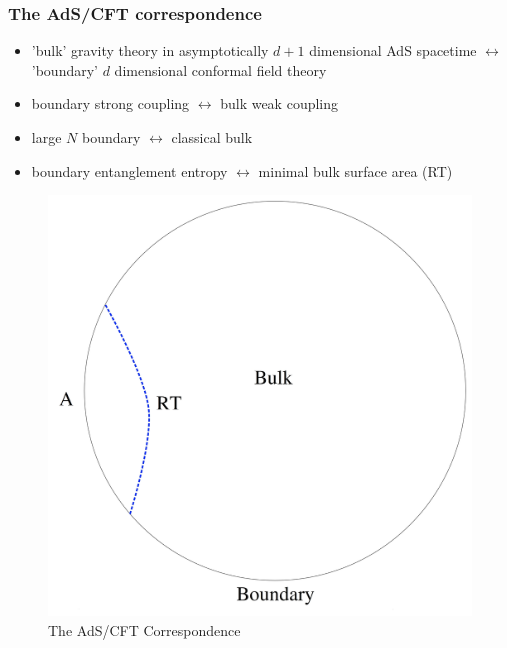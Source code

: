 \documentclass[10pt,aspectratio=169]{beamer}
\begin{document}
\begin{frame}
\frametitle{The AdS/CFT correspondence}

\begin{minipage}[t]{0.48\linewidth}

\begin{itemize}

\item 'bulk' gravity theory in asymptotically $d+1$ dimensional AdS spacetime $\leftrightarrow$ 'boundary' $d$ dimensional conformal field theory

\item boundary strong coupling $\leftrightarrow$ bulk weak coupling

\item large $N$ boundary $\leftrightarrow$ classical bulk

\item boundary entanglement entropy $\leftrightarrow$ minimal bulk surface area (RT)

\end{itemize}

\end{minipage}
%
\hfill
%
\begin{minipage}[t]{0.48\linewidth}

\begin{figure}
    \begin{center}
    
        \includegraphics[scale=0.06]{adscft4}    
    
    \end{center}
    \caption{The AdS/CFT Correspondence}
\end{figure}

\end{minipage}

\end{frame}
\end{document}
